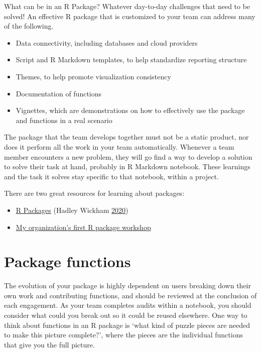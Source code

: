 \documentclass[
]{book}
\providecommand{\tightlist}{%
  \setlength{\itemsep}{0pt}\setlength{\parskip}{0pt}}
\begin{document}
What can be in an R Package? Whatever day-to-day challenges that need to be solved! An effective R package that is customized to your team can address many of the following.

\begin{itemize}
\tightlist
\item
  Data connectivity, including databases and cloud providers
\item
  Script and R Markdown templates, to help standardize reporting structure
\item
  Themes, to help promote visualization consistency
\item
  Documentation of functions
\item
  Vignettes, which are demonstrations on how to effectively use the package and functions in a real scenario
\end{itemize}

The package that the team develops together must not be a static product, nor does it perform all the work in your team automatically. Whenever a team member encounters a new problem, they will go find a way to develop a solution to solve their task at hand, probably in R Markdown notebook. These learnings and the task it solves stay specific to that notebook, within a project.

There are two great resources for learning about packages:

\begin{itemize}
\tightlist
\item
  \href{https://r-pkgs.org}{R Packages} (Hadley Wickham \protect\hyperlink{ref-r-pkgs}{2020})
\item
  \href{https://my-org-first-pkg-2020.netlify.app}{My organization's first R package workshop}
\end{itemize}

\hypertarget{package-functions}{%
\section{Package functions}\label{package-functions}}

The evolution of your package is highly dependent on users breaking down their own work and contributing functions, and should be reviewed at the conclusion of each engagement. As your team completes audits within a notebook, you should consider what could you break out so it could be reused elsewhere. One way to think about functions in an R package is `what kind of puzzle pieces are needed to make this picture complete?', where the pieces are the individual functions that give you the full picture.
\end{document}
